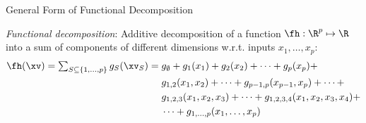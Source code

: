 \documentclass[11pt,compress,t,notes=noshow, aspectratio=169, xcolor=table]{beamer}
\newcommand{\open}{}
\newcommand{\close}{}
\begin{document}
\begin{frame}{General Form of Functional Decomposition
}


\begin{definition}
\textit{Functional decomposition}: Additive decomposition of a function $\fh: \R^p \mapsto \R$ into a sum of components of different dimensions w.r.t. inputs $x_1, \ldots, x_p$: \\
\begin{equation}
\begin{split}
\fh(\xv) = 
\textstyle\sum_{S \subseteq \{1,\ldots,p\}} g_{S}(\xv_S) = \; & g_{\open \emptyset \close} + g_{\open 1 \close}(x_1) + g_{\open 2 \close}(x_2) + \dots + g_{\open p \close}(x_p) + \\
& g_{\open 1, 2 \close}(x_1, x_2) + \dots + g_{\open p-1, p \close}(x_{p-1}, x_p) + \dots + \\
& g_{\open 1, 2, 3 \close}(x_1, x_2, x_3) + \dots + g_{\open 1, 2, 3, 4 \close}(x_1, x_2, x_3, x_4) + \\
& \dots + g_{\open 1,\ldots,p \close}(x_1, \ldots, x_p)
\end{split}
\end{equation}

\end{definition}
\end{frame}
\end{document}
